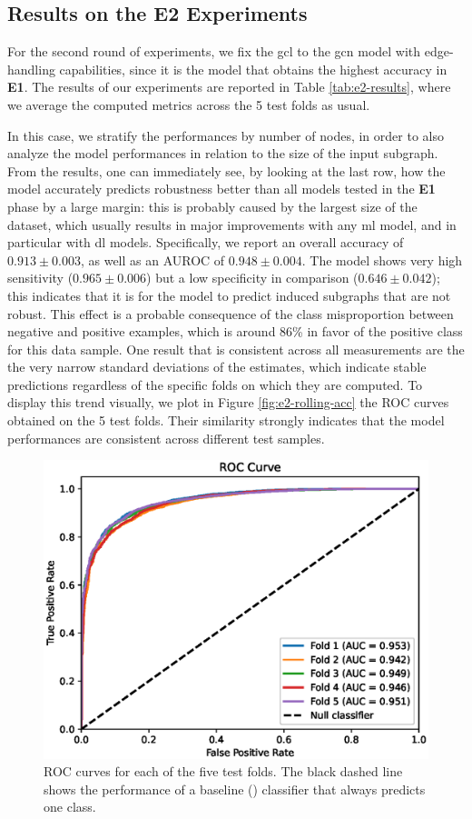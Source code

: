 \subsection{Results on the E2 Experiments}\label{sec:e2-results}
For the second round of experiments, we fix the \gls{gcl} to the \gls{gcn} model with edge-handling capabilities, since it is the model that obtains the highest accuracy in \textbf{E1}.
The results of our experiments are reported in Table \ref{tab:e2-results}, where we average the computed metrics across the 5 test folds as usual.

In this case, we stratify the performances by number of nodes, in order to also analyze the model performances in relation to the size of the input subgraph. From the results, one can immediately see, by looking at the last row, how the model accurately predicts robustness better than all models tested in the \textbf{E1} phase by a large margin: this is probably caused by the largest size of the dataset, which usually results in major improvements with any \gls{ml} model, and in particular with \gls{dl} models. Specifically, we report an overall accuracy of $0.913 \pm 0.003$, as well as an AUROC of $0.948 \pm 0.004$. The model shows very high sensitivity ($0.965 \pm 0.006$) but a low specificity in comparison ($0.646 \pm 0.042$); this indicates that it is  for the model to predict induced subgraphs that are not robust. This effect is a probable consequence of the class misproportion between negative and positive examples, which is around 86\% in favor of the positive class for this data sample. One result that is consistent across all measurements are the the very narrow standard deviations of the estimates, which indicate stable predictions regardless of the specific folds on which they are computed. To display this trend visually, we plot in Figure \ref{fig:e2-rolling-acc} the ROC curves obtained on the 5 test folds. Their similarity strongly indicates that the model performances are consistent across different test samples.
\begin{figure}
    \centering
    \includegraphics[width=.65\textwidth]{Figures/Chapter5/e2-roc-curve.eps}
    \caption{ROC curves for each of the five test folds. The black dashed line shows the performance of a baseline () classifier that always predicts one class.}\label{fig:e2-roc-curve}
\end{figure}
